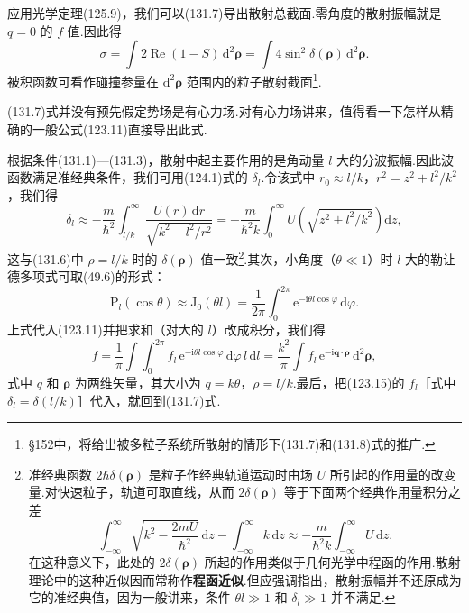 应用光学定理(125.9)，我们可以(131.7)导出散射总截面.零角度的散射振幅就是 $q=0$ 的 $f$ 值.因此得
\begin{equation}
  \sigma=\int2\operatorname{Re}(1-S)\,\mathrm{d}^2\boldsymbol{\rho}
  =\int4\sin^2\delta(\boldsymbol{\rho})\,\mathrm{d}^2\boldsymbol{\rho}.
\end{equation}
被积函数可看作碰撞参量在 $\mathrm{d}^2\boldsymbol{\rho}$ 范围内的粒子散射截面\footnote{§152中，将给出被多粒子系统所散射的情形下(131.7)和(131.8)式的推广.}.

(131.7)式并没有预先假定势场是有心力场.对有心力场讲来，值得看一下怎样从精确的一般公式(123.11)直接导出此式.

根据条件(131.1)—(131.3)，散射中起主要作用的是角动量 $l$ 大的分波振幅.因此波函数满足准经典条件，我们可用(124.1)式的 $\delta_l$.令该式中 $r_0\approx l/k$，$r^2=z^2+l^2/k^2$，我们得
\begin{equation*}
  \delta_l\approx-\frac{m}{\hbar^2}\int_{l/k}^{\infty}
  \frac{U(r)\,\mathrm{d}r}{\sqrt{k^2-l^2/r^2}}
  =-\frac{m}{\hbar^2k}\int_0^{\infty}
  U\left(\sqrt{z^2+l^2/k^2}\right)\mathrm{d}z,
\end{equation*}
这与(131.6)中 $\rho=l/k$ 时的 $\delta(\boldsymbol{\rho})$ 值一致\footnote{准经典函数 $2\hbar\delta(\boldsymbol{\rho})$ 是粒子作经典轨道运动时由场 $U$ 所引起的作用量的改变量.对快速粒子，轨道可取直线，从而 $2\delta(\boldsymbol{\rho})$ 等于下面两个经典作用量积分之差
\begin{equation*}
  \int_{-\infty}^{\infty}\sqrt{k^2-\frac{2mU}{\hbar^2}}\,\mathrm{d}z-\int_{-\infty}^{\infty}k\,\mathrm{d}z
  \approx-\frac{m}{\hbar^2 k}\int_{-\infty}^{\infty}U\,\mathrm{d}z.
\end{equation*}
在这种意义下，此处的 $2\delta(\boldsymbol{\rho})$ 所起的作用类似于几何光学中程函的作用.散射理论中的这种近似因而常称作\textbf{程函近似}.但应强调指出，散射振幅并不还原成为它的准经典值，因为一般讲来，条件 $\theta l\gg1$ 和 $\delta_l\gg1$ 并不满足.}.其次，小角度（$\theta\ll1$）时 $l$ 大的勒让德多项式可取(49.6)的形式：
\begin{equation*}
  \mathrm{P}_l(\cos\theta)\approx\mathrm{J}_0(\theta l)
  =\frac{1}{2\pi}\int_0^{2\pi}
  \mathrm{e}^{-\mathrm{i}\theta l\cos\varphi}\,\mathrm{d}\varphi.
\end{equation*}
上式代入(123.11)并把求和（对大的 $l$）改成积分，我们得
\begin{equation}
  f=\frac{1}{\pi}\int\!\!\int_0^{2\pi}
  f_l\,\mathrm{e}^{-\mathrm{i}\theta l\cos\varphi}\,
  \mathrm{d}\varphi\, l\,\mathrm{d}l
  =\frac{k^2}{\pi}\int f_l\,
  \mathrm{e}^{-\mathrm{i}\boldsymbol{q}\cdot\boldsymbol{\rho}}\,
  \mathrm{d}^2\boldsymbol{\rho},
\end{equation}
式中 $q$ 和 $\boldsymbol{\rho}$ 为两维矢量，其大小为 $q=k\theta$，$\rho=l/k$.最后，把(123.15)的 $f_l$［式中 $\delta_l=\delta(l/k)$］代入，就回到(131.7)式.

